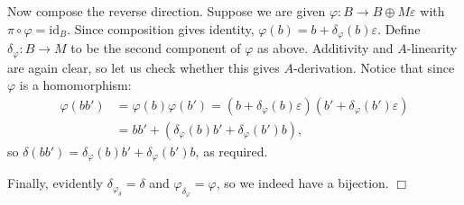 \documentclass{template}
\newcommand{\qedwhite}{\hfill \ensuremath{\Box}}
\begin{document}
Now compose the reverse direction. Suppose we are given $\varphi: B \to B \oplus
M\varepsilon$ with $\pi \circ \varphi = \text{id}_B$. Since composition gives
identity, $\varphi(b) = b + \delta_{\varphi}(b)\varepsilon$. Define
$\delta_{\varphi}: B \to M$ to be the second component of $\varphi$ as above.
Additivity and $A$-linearity are again clear, so let us check whether this gives
$A$-derivation. Notice that since $\varphi$ is a homomorphism:
\begin{align*}
    \varphi(bb') &= \varphi(b)\varphi(b') = (b + \delta_{\varphi}(b)\varepsilon)(b' + \delta_{\varphi}(b')\varepsilon) \\
    &= bb' + (\delta_{\varphi}(b)b' + \delta_{\varphi}(b')b),
\end{align*}
so $\delta(bb') = \delta_{\varphi}(b)b' + \delta_{\varphi}(b')b$, as required.

Finally, evidently $\delta_{\varphi_{\delta}} = \delta$ and
$\varphi_{\delta_{\varphi}} = \varphi$, so we indeed have a bijection. \qedwhite
\end{document}
